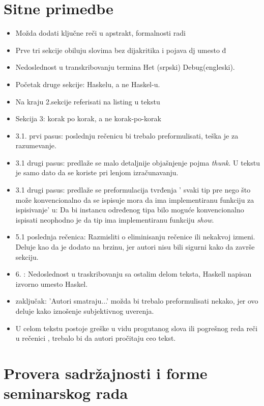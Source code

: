\documentclass[a4paper]{report}
\begin{document}
\section{Sitne primedbe}
\begin{itemize}
	\item Možda dodati ključne reči u apstrakt, formalnosti radi
	\item Prve tri sekcije obiluju slovima bez dijakritika i pojava dj umesto đ
	\item Nedoslednost u transkribovanju termina Het (srpski) Debug(engleski).
	\item Početak druge sekcije: Haskelu, a ne Haskel-u.
	\item Na kraju 2.sekcije referisati na listing u tekstu
	\item Sekcija 3: korak po korak, a ne korak-po-korak
	\item 3.1. prvi pasus: poslednju rečenicu bi trebalo preformulisati, teška je za razumevanje.
	\item 3.1 drugi pasus: predlaže se malo detaljnije objašnjenje pojma \emph{thunk}. U tekstu je samo
	dato da se koriste pri lenjom izračunavanju.
	\item 3.1 drugi pasus: predlaže se preformulacija tvrđenja ' svaki tip pre nego što može konvencionalno da se ispisuje
	mora da ima implementiranu funkciju za ispisivanje' u: Da bi instancu određenog tipa bilo moguće konvencionalno
	ispisati neophodno je da tip ima implementiranu funkciju \emph{show}.
	\item 5.1 poslednja rečenica: Razmisliti o eliminisanju rečenice ili nekakvoj izmeni. Deluje kao da je dodato na brzinu, 
	jer autori nisu bili sigurni kako da završe sekciju.
	\item 6. : Nedoslednost u traskribovanju sa ostalim delom teksta, Haskell napisan izvorno umesto Haskel.
	\item zaključak: 'Autori smatraju...' možda bi trebalo preformulisati nekako, jer ovo deluje kako iznošenje subjektivnog
	uverenja.
	\item  U celom tekstu postoje  greške u vidu progutanog slova ili pogrešnog reda reči u rečenici , trebalo bi da autori pročitaju ceo tekst.\\
\end{itemize}

\section{Provera sadržajnosti i forme seminarskog rada}
\end{document}
